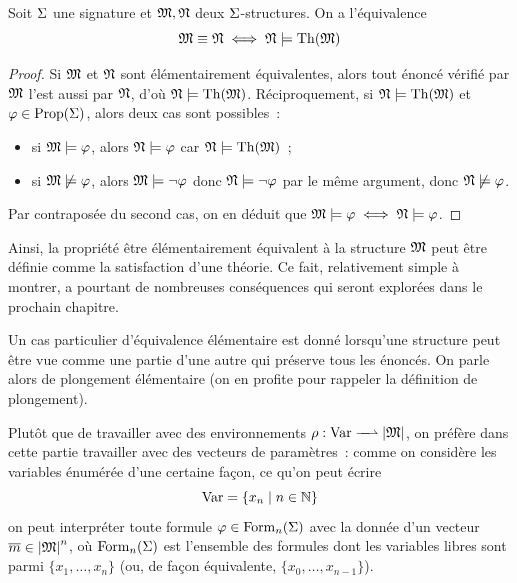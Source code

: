 \begin{lemma}\label{lem.equivelt.th}
  Soit $\Sigma$ une signature et $\mathfrak{M},\mathfrak{N}$ deux $\Sigma$-structures. On a
  l'équivalence
  \[\mathfrak{M}\equiv\mathfrak{N} \iff \mathfrak{N}\models \operatorname{Th}(\mathfrak{M})\]
\end{lemma}

\begin{proof}
  Si $\mathfrak{M}$ et $\mathfrak{N}$ sont élémentairement équivalentes, alors tout énoncé
  vérifié par $\mathfrak{M}$ l'est aussi par $\mathfrak{N}$, d'où
  $\mathfrak{N}\models\operatorname{Th}(\mathfrak{M})$. Réciproquement, si $\mathfrak{N}\models\operatorname{Th}(\mathfrak{M})$ et
  $\varphi\in\operatorname{Prop}(\Sigma)$, alors deux cas sont possibles~:
  \begin{itemize}
  \item si $\mathfrak{M}\models\varphi$, alors $\mathfrak{N}\models\varphi$ car
    $\mathfrak{N}\models\operatorname{Th}(\mathfrak{M})$~;
  \item si $\mathfrak{M}\not\models\varphi$, alors $\mathfrak{M}\models\lnot\varphi$ donc
    $\mathfrak{N}\models\lnot\varphi$ par le même argument, donc
    $\mathfrak{N}\not\models\varphi$.
  \end{itemize}
  Par contraposée du second cas, on en déduit que
  $\mathfrak{M}\models\varphi\iff\mathfrak{N}\models\varphi$.
\end{proof}

Ainsi, la propriété \og être élémentairement équivalent à la structure
$\mathfrak{M}$\fg{} peut être définie comme la satisfaction d'une théorie. Ce fait,
relativement simple à montrer, a pourtant de nombreuses conséquences qui seront
explorées dans le prochain chapitre.

Un cas particulier d'équivalence élémentaire est donné lorsqu'une structure peut
être vue comme une partie d'une autre qui préserve tous les énoncés. On parle
alors de plongement élémentaire (on en profite pour rappeler la définition de
plongement).

\begin{notation}
  Plutôt que de travailler avec des environnements
  $\makeFunNamePartial{\env}{\Var}{\carMM}$, on préfère dans cette partie
  travailler avec des vecteurs de paramètres~: comme on considère les variables
  énumérée d'une certaine façon, ce qu'on peut écrire
  \[\operatorname{Var} = \left\{ x_n \;\middle\vert\; n \in \mathbb N \right\}\]
  on peut interpréter toute formule $\varphi\in\operatorname{Form}_n(\Sigma)$ avec la
  donnée d'un vecteur $\overline{m} \in \left\vert \mathfrak{M}\right\vert^n$, où $\operatorname{Form}_n(\Sigma)$ est
  l'ensemble des formules dont les variables libres sont parmi
  $\{x_1,\ldots,x_n\}$ (ou, de façon équivalente, $\{x_0,\ldots,x_{n-1}\}$).
\end{notation}

